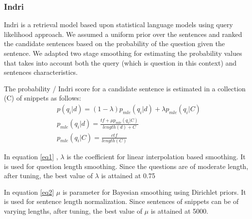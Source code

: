 \documentclass[11pt,a4paper]{article}
\begin{document}



\subsubsection{Indri}

Indri \cite{Indri} is a retrieval model based upon statistical language models using query likelihood approach. We assumed a uniform prior over the sentences and ranked the candidate sentences based on the probability of the question given the sentence. We adapted two stage smoothing for estimating the probability values that takes into account both the query (which is question in this context) and sentences characteristics. 

The probability / Indri score for a candidate sentence is estimated in a collection (C) of snippets as follows:
\begin{align}
    & p(q_i|d) = (1-\lambda) p_{mle} (q_i|d) + \lambda p_{mle} (q_i|C) \label{eq1} \\ 
    & p_{mle}(q_i|d) = 
    \frac{tf + \mu  p_{mle}(q_i|C)}{length(d) + C} \label{eq2} \\ 
    & p_{mle}(q_i | C) = \frac{ctf}{length(C)}
\end{align}

In equation \ref{eq1} , $\lambda$ is the coefficient for linear interpolation based smoothing. It is used for question length smoothing. Since the questions are of moderate length, after tuning, the best value of $\lambda$ is attained at 0.75

In equation \ref{eq2} $\mu$ is parameter for Bayesian smoothing using Dirichlet priors. It is used for sentence length normalization. Since sentences of snippets can be of varying lengths, after tuning, the best value of $\mu$ is attained at 5000.
\end{document}
